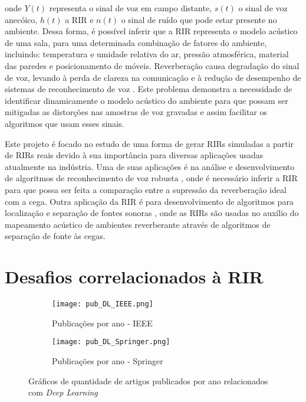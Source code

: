 \noindent
onde $Y(t)$ representa o sinal de voz em campo distante, $s(t)$ o sinal de voz anecóico, $h(t)$ a RIR e $n(t)$ o sinal de ruído que pode
estar presente no ambiente.
Dessa forma, é possível inferir que a RIR representa o modelo acústico de uma sala, para uma determinada combinação de fatores do ambiente, incluindo: 
temperatura e umidade relativa do ar, pressão atmosférica, material das paredes e posicionamento de móveis.
Reverberação causa degradação do sinal de voz, levando à perda de clareza na comunicação \cite{Speech_intellig_hear} e à redução de desempenho
de sistemas de reconhecimento de voz \cite{reverb_sup_speech_reg}. Este problema demonstra a necessidade de identificar dinamicamente o modelo acústico
do ambiente para que possam ser mitigadas as distorções nas amostras de voz gravadas e assim facilitar os algoritmos que usam esses sinais.

Este projeto é focado no estudo de uma forma de gerar RIRs simuladas a partir de RIRs reais devido à sua importância para diversas
aplicações usadas atualmente na indústria. Uma de suas aplicações é na análise e desenvolvimento de algoritmos de 
reconhecimento de voz robusta \cite{reverb_sup_speech_reg}, onde é necessário inferir a RIR para que possa ser feita a comparação entre
a supressão da reverberação ideal com a cega.
Outra aplicação da RIR é para desenvolvimento de algoritmos para localização e separação de fontes sonoras \cite{Source_sep_RIR},
onde as RIRs são usadas no auxílio do mapeamento acústico de ambientes reverberante através de algoritmos de separação de fonte às cegas.

\section{Desafios correlacionados à RIR}

\begin{figure} [H]
    \begin{subfigure}{1\textwidth}
        \centering
        \texttt{[image: pub\_DL\_IEEE.png]}
        \caption{Publicações por ano - IEEE}    
    \end{subfigure}
    \begin{subfigure}{1\textwidth}
        \centering
        \texttt{[image: pub\_DL\_Springer.png]}
        \caption{Publicações por ano - Springer\textregistered}    
    \end{subfigure}
    \caption{Gráficos de quantidade de artigos publicados por ano relacionados com \textit{Deep Learning}}
    \label{fig:pub_DL}
\end{figure}

